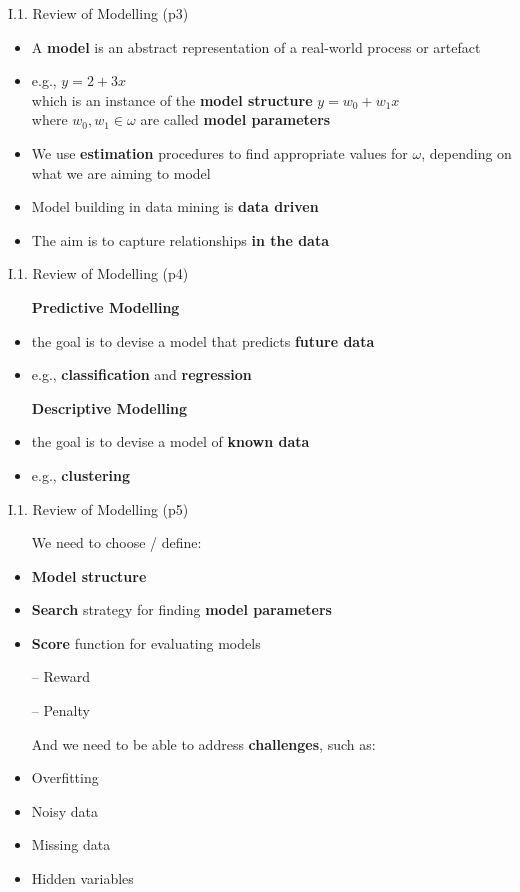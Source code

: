 \documentclass[handout]{beamer}
\newcommand{\strong}[1]{\textbf{\color{teal} #1}}
\newcommand{\stronger}[1]{\textbf{\color{purple} #1}}
\begin{document}
\begin{frame}{I.1. Review of Modelling (p3)}
\begin{itemize}
\item A \stronger{model} is an abstract representation of a real-world process or artefact
\item e.g., $y = 2 + 3x$\\
which is an instance of the \stronger{model structure} $y = w_0 + w_1 x$\\
where $w_0,w_1 \in \omega$ are called \stronger{model parameters}
\item[]
\item We use \stronger{estimation} procedures to find appropriate values for $\omega$, depending on what we are aiming to model
\item Model building in data mining is \strong{data driven}
\item The aim is to capture relationships \strong{in the data}
\end{itemize}
\end{frame}
\begin{frame}{I.1. Review of Modelling (p4)}
\begin{itemize}
\item[] \stronger{Predictive Modelling}
\item the goal is to devise a model that predicts \strong{future data}
\item e.g., \stronger{classification} and \stronger{regression}
\item[]
\item[] \stronger{Descriptive Modelling}
\item the goal is to devise a model of \strong{known data}
\item e.g., \stronger{clustering}
\end{itemize}
\end{frame}
\begin{frame}[fragile]{I.1. Review of Modelling (p5)}
\begin{itemize}
\item[] We need to choose / define:
\item \stronger{Model structure}
\item \stronger{Search} strategy for finding \stronger{model parameters}
\item \stronger{Score} function for evaluating models
\item[--] Reward
\item[--] Penalty
\item[]
\item[] And we need to be able to address \strong{challenges}, such as:
\item Overfitting
\item Noisy data
\item Missing data
\item Hidden variables
%
\end{itemize}
\end{frame}
\end{document}

